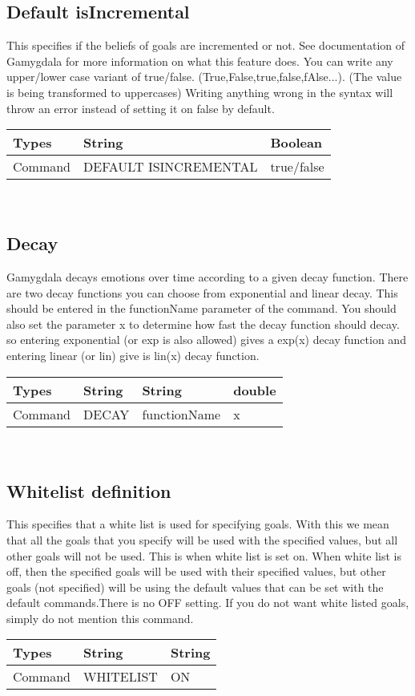 \documentclass{scrartcl}
\begin{document}
\subsection{Default isIncremental}
This specifies if the beliefs of goals are incremented or not. See documentation of Gamygdala for more information on what this feature does.
You can write any upper/lower case variant of true/false. (True,False,true,false,fAlse...). (The value is being transformed to uppercases)
Writing anything wrong in the syntax will throw an error instead of setting it on false by default.\\
\begin{tabular}{|l|l|l|}
	\hline  Types & String & Boolean  \\ 
	\hline  Command & DEFAULT ISINCREMENTAL & true/false  \\ 
	\hline 
\end{tabular}
\\
\subsection{Decay}
Gamygdala decays emotions over time according to a given decay function. There are two decay functions you can choose from exponential and linear decay. This should be entered in the functionName parameter of the command. You should also set the parameter x to determine how fast the decay function should decay. so entering exponential (or exp is also allowed) gives a exp(x) decay function and entering linear (or lin) give is lin(x) decay function. \\
\begin{tabular}{|l|l|l|l|}
	\hline  Types & String & String & double  \\ 
	\hline  Command & DECAY & functionName & x \\
	\hline  
\end{tabular}
\\
\subsection{Whitelist definition}
This specifies that a white list is used for specifying goals. With this we mean that all the goals that you specify will be used with the specified values, but all other goals will not be used. This is when white list is set on. When white list is off, then the specified goals will be used with their specified values, but other goals (not specified) will be using the default values that can be set with the default commands.There is no OFF setting. If you do not want  white listed goals, simply do not mention this command.\\
\begin{tabular}{|l|l|l|}
	\hline  Types & String & String  \\ 
	\hline  Command & WHITELIST & ON  \\ 
	\hline  
\end{tabular}
\\
\end{document}
